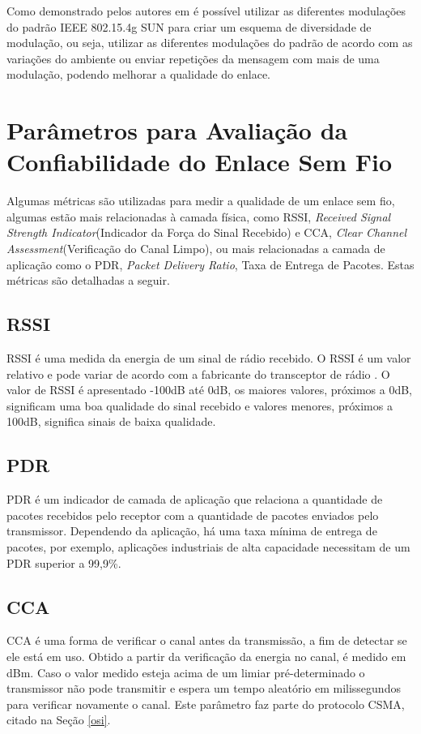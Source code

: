 Como demonstrado pelos autores em \cite{gomes2020improving} é possível utilizar as diferentes modulações do padrão IEEE 802.15.4g SUN para criar um esquema de diversidade de modulação, ou seja, utilizar as diferentes modulações do padrão de acordo com as variações do ambiente ou enviar repetições da mensagem com mais de uma modulação, podendo melhorar a qualidade do enlace.

\section{Parâmetros para Avaliação da Confiabilidade do Enlace Sem Fio}
\label{paramSF}
Algumas métricas são utilizadas para medir a qualidade de um enlace sem fio, algumas estão mais relacionadas à camada física, como RSSI, \emph{Received Signal Strength Indicator}(Indicador da Força do Sinal Recebido) e CCA, \emph{Clear Channel Assessment}(Verificação do Canal Limpo), ou mais relacionadas a camada de aplicação como o PDR, \emph{Packet Delivery Ratio}, Taxa de Entrega de Pacotes. Estas métricas são detalhadas a seguir.
\subsection*{RSSI}
RSSI é uma medida da energia de um sinal de rádio recebido. O RSSI é um valor relativo e pode variar de acordo com a fabricante do transceptor de rádio \cite{UNDERSTANDING_RSSI}. O valor de RSSI é apresentado -100dB até 0dB, os maiores valores, próximos a 0dB, significam uma boa qualidade do sinal recebido e valores menores, próximos a 100dB, significa sinais de baixa qualidade.

\subsection*{PDR}
PDR é um indicador de camada de aplicação que relaciona a quantidade de pacotes recebidos pelo receptor com a quantidade de pacotes enviados pelo transmissor. Dependendo da aplicação, há uma taxa mínima de entrega de pacotes, por exemplo,  aplicações industriais de alta capacidade necessitam de um PDR superior a 99,9\%.

\subsection*{CCA}
CCA é uma forma de verificar o canal antes da transmissão, a fim de detectar se ele está em uso. Obtido a partir da verificação da energia no canal, é medido em dBm. Caso o valor medido esteja acima de um limiar pré-determinado o transmissor não pode transmitir e espera um tempo aleatório em milissegundos para verificar novamente o canal. Este parâmetro faz parte do protocolo CSMA, citado na Seção \ref{osi}.

